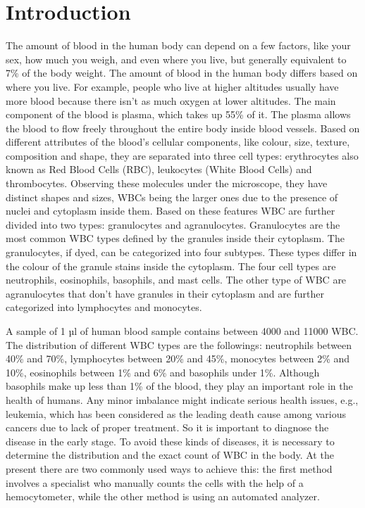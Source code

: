 \section{Introduction}
The amount of blood in the human body can depend on a few factors, like your sex, how much you weigh, and even where you live, but generally equivalent to 7\% of the body weight. The amount of blood in the human body differs based on where you live. For example, people who live at higher altitudes usually have more blood because there isn’t as much oxygen at lower altitudes. The main component of the blood is plasma, which takes up 55\% of it.
The plasma allows the blood to flow freely throughout the entire body inside blood vessels. Based on different attributes of the blood’s cellular components, like colour, size, texture, composition and shape, they are separated into three cell types: erythrocytes also known as Red Blood Cells (RBC), leukocytes (White Blood Cells) and thrombocytes. Observing these molecules under the microscope, they have distinct shapes and sizes, WBCs being the larger ones due to the presence of nuclei and cytoplasm inside them. 
Based on these features WBC are further divided into two types: granulocytes and agranulocytes. 
Granulocytes are the most common WBC types defined by the granules inside their cytoplasm. The granulocytes, if dyed, can be categorized into four subtypes. These types differ in the colour of the granule stains inside the cytoplasm. The four cell types are neutrophils, eosinophils, basophils, and mast cells. The other type of WBC are agranulocytes that don't have granules in their cytoplasm and are further categorized into lymphocytes and monocytes.


A sample of 1 µl of human blood sample contains between 4000 and 11000 WBC. The distribution of different WBC types are the followings: neutrophils between 40\% and 70\%, lymphocytes between 20\% and 45\%, monocytes between 2\% and 10\%, eosinophils between 1\% and 6\% and basophils under 1\%. Although basophils make up less than 1\% of the blood, they play an important role in the health of humans. Any minor imbalance might indicate serious health issues, e.g., leukemia, 
which has been considered as the leading death cause among various cancers due to lack of proper treatment. So it is important to diagnose the disease in the early stage. To avoid these kinds of diseases, it is necessary to determine the distribution and the exact count of WBC in the body. At the present there are two commonly used ways to achieve this: the first method involves a specialist who manually counts the cells with the help of a hemocytometer, while the other method is using an automated analyzer.

